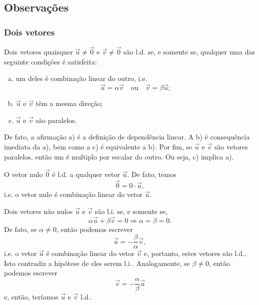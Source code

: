 \subsection{Observações}\label{cap_base_sec_deplin_subsec_obs}

\subsubsection{Dois vetores}

Dois vetores quaisquer $\vec{u}\neq\vec{0}$ e $\vec{v}\neq\vec{0}$ são l.d. se, e somente se, qualquer uma das seguinte condições é satisfeita:
\begin{enumerate}[a)]
\item um deles é combinação linear do outro, i.e.
  \begin{equation}
    \vec{u} = \alpha\vec{v}\quad\text{ou}\quad\vec{v}=\beta\vec{u};
  \end{equation}
\item $\vec{u}$ e $\vec{v}$ têm a mesma direção;
\item $\vec{u}$ e $\vec{v}$ são paralelos.
\end{enumerate}
De fato, a afirmação a) é a definição de dependência linear. A b) é consequência imediata da a), bem como a c) é equivalente a b). Por fim, se $\vec{u}$ e $\vec{v}$ são vetores paralelos, então um é multiplo por escalar do outro. Ou seja, c) implica a).

\begin{obs}
  O vetor nulo $\vec{0}$ é l.d. a qualquer vetor $\vec{u}$. De fato, temos
  \begin{equation}
    \vec{0} = 0\cdot\vec{u},
  \end{equation}
  i.e. o vetor nulo é combinação linear do vetor $\vec{u}$.
\end{obs}

\begin{obs}
  Dois vetores não nulos $\vec{u}$ e $\vec{v}$ são l.i. se, e somente se,
  \begin{equation}
    \alpha\vec{u} + \beta\vec{v} = 0 \Rightarrow \alpha=\beta=0.
  \end{equation}
  De fato, se $\alpha\neq 0$, então podemos escrever
  \begin{equation}
    \vec{u} = -\frac{\beta}{\alpha}\vec{v},
  \end{equation}
  i.e. o vetor $\vec{u}$ é combinação linear do vetor $\vec{v}$ e, portanto, estes vetores são l.d.. Isto contradiz a hipótese de eles serem l.i.. Analogamente, se $\beta \neq 0$, então podemos escrever
  \begin{equation}
    \vec{v} = -\frac{\alpha}{\beta}\vec{u}
  \end{equation}
  e, então, teríamos $\vec{u}$ e $\vec{v}$ l.d..
\end{obs}


